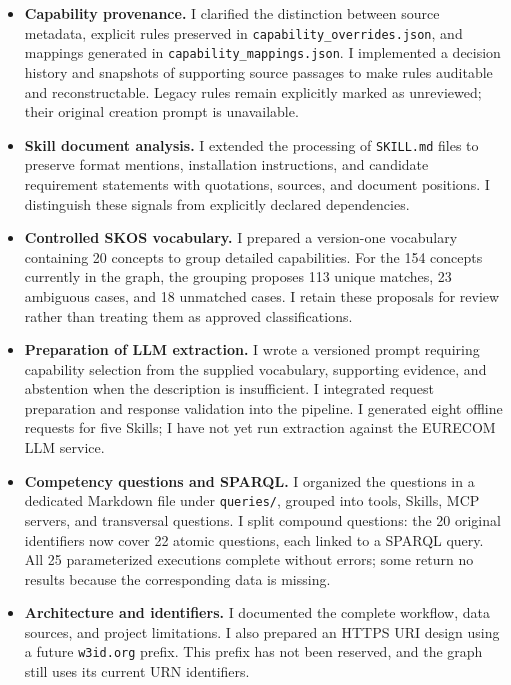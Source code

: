 \documentclass[11pt,a4paper]{article}
\begin{document}
\begin{itemize}
    \item \textbf{Capability provenance.} I clarified the distinction between source metadata, explicit rules preserved in \texttt{capability\_overrides.json}, and mappings generated in \texttt{capability\_mappings.json}. I implemented a decision history and snapshots of supporting source passages to make rules auditable and reconstructable. Legacy rules remain explicitly marked as unreviewed; their original creation prompt is unavailable.

    \item \textbf{Skill document analysis.} I extended the processing of \texttt{SKILL.md} files to preserve format mentions, installation instructions, and candidate requirement statements with quotations, sources, and document positions. I distinguish these signals from explicitly declared dependencies.

    \item \textbf{Controlled SKOS vocabulary.} I prepared a version-one vocabulary containing 20 concepts to group detailed capabilities. For the 154 concepts currently in the graph, the grouping proposes 113 unique matches, 23 ambiguous cases, and 18 unmatched cases. I retain these proposals for review rather than treating them as approved classifications.

    \item \textbf{Preparation of LLM extraction.} I wrote a versioned prompt requiring capability selection from the supplied vocabulary, supporting evidence, and abstention when the description is insufficient. I integrated request preparation and response validation into the pipeline. I generated eight offline requests for five Skills; I have not yet run extraction against the EURECOM LLM service.

    \item \textbf{Competency questions and SPARQL.} I organized the questions in a dedicated Markdown file under \texttt{queries/}, grouped into tools, Skills, MCP servers, and transversal questions. I split compound questions: the 20 original identifiers now cover 22 atomic questions, each linked to a SPARQL query. All 25 parameterized executions complete without errors; some return no results because the corresponding data is missing.

    \item \textbf{Architecture and identifiers.} I documented the complete workflow, data sources, and project limitations. I also prepared an HTTPS URI design using a future \texttt{w3id.org} prefix. This prefix has not been reserved, and the graph still uses its current URN identifiers.
\end{itemize}
\end{document}
